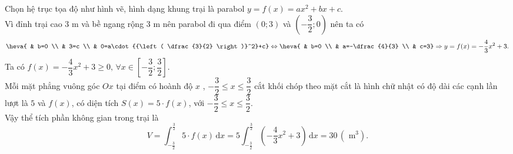 \begin{bt}
{		Chọn hệ trục tọa độ như hình vẽ, hình dạng khung trại  là parabol $y=f(x)=ax^2+bx+c$.\\
		Vì đỉnh trại  cao $3$ m và bề ngang rộng $3$ m nên parabol đi qua điểm $(0;3)$ và $\left(-\dfrac{3}{2};0 \right)$ nên ta có
		 \[\heva{
		& b=0 \\ 
		&  3=c \\
		 & 0=a\cdot {{\left( \dfrac{3}{2} \right)}^2}+c}
		\Leftrightarrow  \heva{
		 & b=0 \\
		& a=-\dfrac{4}{3}  \\
		& c=3}\Rightarrow y=f(x)=-\dfrac{4}{3}x^2+3.\] 
		Ta có $f(x)=-\dfrac{4}{3}x^2+3 \geq 0,\, \forall  x \in \left[-\dfrac{3}{2}; \dfrac{3}{2}\right]$.\\
		Mỗi mặt phẳng vuông góc $Ox$ tại điểm có hoành độ $x$ , $-\dfrac{3}{2}\le x\le \dfrac{3}{2}$ cắt khối chóp theo mặt cắt là hình chữ nhật có độ dài các cạnh  lần lượt là $5$ và $ f(x)$, có diện tích $S(x)=5\cdot f(x)$, với $-\dfrac{3}{2}\le x\le \dfrac{3}{2}$.\\
		Vậy thể tích phần  không gian trong trại là \[V=\displaystyle\int_{-\tfrac{3}{2}}^{\tfrac{3}{2}}{5\cdot f(x)}\mathrm{\,d}x=5\displaystyle\int_{-\tfrac{3}{2}}^{\tfrac{3}{2}}{\left( -\frac{4}{3}x^2+3 \right)}\mathrm{\,d}x=30\,\left( \text{ m}^3\right) .\]
	} 
\end{bt}

